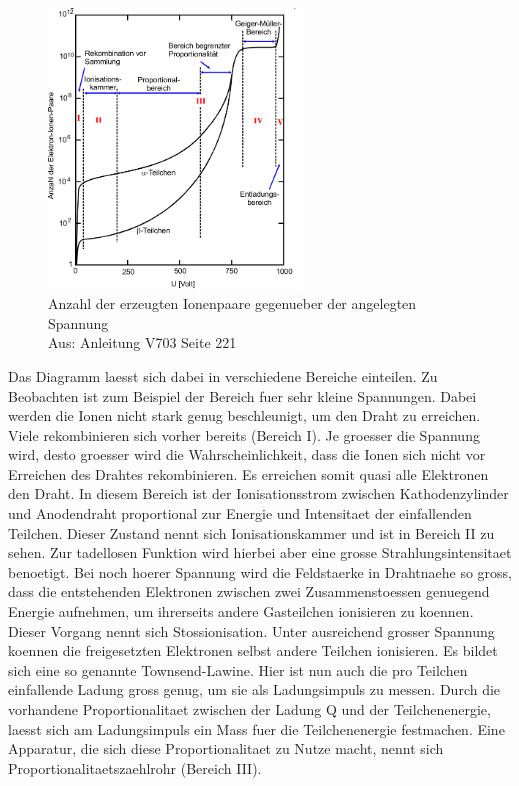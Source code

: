\documentclass[titlepage=firstcover, captions=tableheading]{scrartcl}
\begin{document}
 \begin{figure}[H]
    \centering
    \includegraphics[width=0.6\textwidth]{"Spannung_Geiger.png"}
    \caption{Anzahl der erzeugten Ionenpaare gegenueber der angelegten Spannung\\ Aus: Anleitung V703 Seite 221}
    \label{Fig:Spannung}
\end{figure}
\noindent Das Diagramm laesst sich dabei in verschiedene Bereiche einteilen. Zu Beobachten ist zum Beispiel der Bereich fuer sehr kleine Spannungen. Dabei werden die Ionen nicht stark genug beschleunigt, um den Draht zu erreichen. Viele rekombinieren sich vorher bereits (Bereich I). Je groesser die Spannung wird, desto groesser wird die Wahrscheinlichkeit, dass die Ionen sich nicht vor Erreichen des Drahtes rekombinieren. Es erreichen somit quasi alle Elektronen den Draht. In diesem Bereich ist der Ionisationsstrom zwischen Kathodenzylinder und Anodendraht proportional zur Energie und Intensitaet der einfallenden Teilchen. Dieser Zustand nennt sich Ionisationskammer und ist in Bereich II zu sehen. Zur tadellosen Funktion wird hierbei aber eine grosse Strahlungsintensitaet benoetigt. Bei noch hoerer Spannung wird die Feldstaerke in Drahtnaehe so gross, dass die entstehenden Elektronen zwischen zwei Zusammenstoessen genuegend Energie aufnehmen, um ihrerseits andere Gasteilchen ionisieren zu koennen. Dieser Vorgang nennt sich Stossionisation. Unter ausreichend grosser Spannung koennen die freigesetzten Elektronen selbst andere Teilchen ionisieren. Es bildet sich eine so genannte Townsend-Lawine. Hier ist nun auch die pro Teilchen einfallende Ladung gross genug, um sie als Ladungsimpuls zu messen. Durch die vorhandene Proportionalitaet zwischen der Ladung Q und der Teilchenenergie, laesst sich am Ladungsimpuls ein Mass fuer die Teilchenenergie festmachen. Eine Apparatur, die sich diese Proportionalitaet zu Nutze macht, nennt sich Proportionalitaetszaehlrohr (Bereich III).
\end{document}
